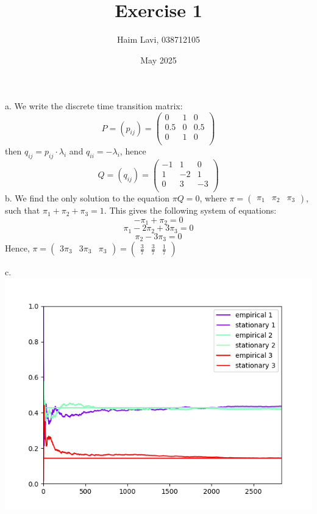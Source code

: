 \documentclass{article}
\title{Exercise 1}
\author{Haim Lavi, 038712105}
\date{May 2025}
\begin{document}
\maketitle

a. We write the discrete time transition matrix:
\[
P=(p_{ij})=\begin{pmatrix}
    0 & 1 & 0 \\
    0.5 & 0 & 0.5 \\
    0 & 1 & 0 \\
\end{pmatrix}
\]
then $q_{ij}=p_{ij}\cdot\lambda_i$ and $q_{ii}=-\lambda_i$, hence
\[
Q=(q_{ij})=\begin{pmatrix}
    -1 & 1 & 0 \\
    1 & -2 & 1 \\
    0 & 3 & -3 \\
\end{pmatrix}
\]
b. We find the only solution to the equation $\pi{Q}=0$, where $\pi=\begin{pmatrix}
    \pi_1 & \pi_2 & \pi_3
\end{pmatrix}$, such that $\pi_1+\pi_2+\pi_3=1$. This gives the following system of equations:
\[-\pi_1+\pi_2=0\]
\[\pi_1-2\pi_2+3\pi_3=0\]
\[\pi_2-3\pi_3=0\]
Hence, $\pi=\begin{pmatrix}
    3\pi_3 & 3\pi_3 & \pi_3
\end{pmatrix}=\begin{pmatrix}
    \frac{3}{7} & \frac{3}{7} & \frac{1}{7}
\end{pmatrix}$

c. \includegraphics{ctmc1.png}
\end{document}

